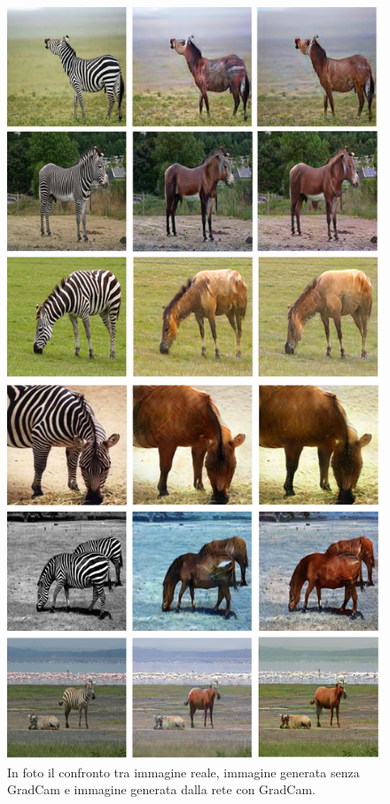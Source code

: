\begin{figure}[H]
\begin{center}
\includegraphics[width=0.6\columnwidth]{images/merge.png}
\end{center}
\caption{In foto il confronto tra immagine reale, immagine generata senza GradCam e immagine generata dalla rete con GradCam.}
\label{fig:Confronto GradCam e noGradCam cavalli}
\end{figure}  

